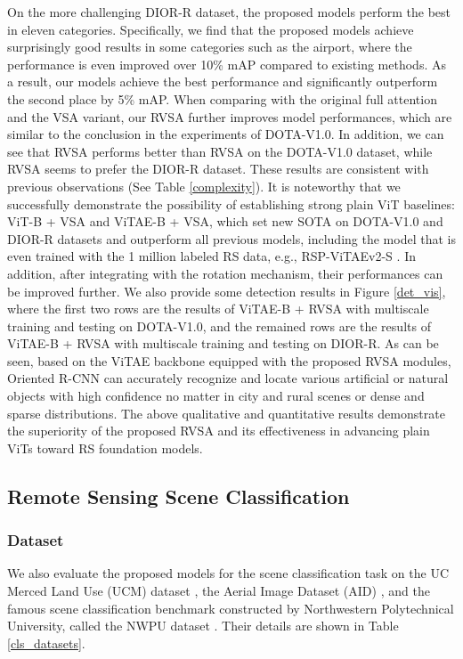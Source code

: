 \documentclass[10pt, journal,twoside]{IEEEtran}
\begin{document}
On the more challenging DIOR-R dataset, the proposed models perform the best in eleven categories. Specifically, we find that the proposed models achieve surprisingly good results in some categories such as the airport, where the performance is even improved over 10\% mAP compared to existing methods. As a result, our models achieve the best performance and significantly outperform the second place by 5\% mAP. When comparing with the original full attention and the VSA variant, our RVSA further improves model performances, which are similar to the conclusion in the experiments of DOTA-V1.0. In addition, we can see that RVSA performs better than RVSA on the DOTA-V1.0 dataset, while RVSA seems to prefer the DIOR-R dataset. These results are consistent with previous observations (See Table \ref{complexity}). It is noteworthy that we successfully demonstrate the possibility of establishing strong plain ViT baselines: ViT-B + VSA and ViTAE-B + VSA, which set new SOTA on DOTA-V1.0 \cite{dota1} and DIOR-R \cite{aod_2022_tgrs_dior_r_aopg} datasets and outperform all previous models, including the model that is even trained with the 1 million labeled RS data, e.g., RSP-ViTAEv2-S \cite{wang_rsp_2022}. In addition, after integrating with the rotation mechanism, their performances can be improved further. We also provide some detection results in Figure \ref{det_vis}, where the first two rows are the results of ViTAE-B + RVSA with multiscale training and testing on DOTA-V1.0, and the remained rows are the results of ViTAE-B + RVSA with multiscale training and testing on DIOR-R. As can be seen, based on the ViTAE backbone equipped with the proposed RVSA modules, Oriented R-CNN can accurately recognize and locate various artificial or natural objects with high confidence no matter in city and rural scenes or dense and sparse distributions. The above qualitative and quantitative results demonstrate the superiority of the proposed RVSA and its effectiveness in advancing plain ViTs toward RS foundation models. 
 

\subsection{Remote Sensing Scene Classification}
\subsubsection{Dataset}
We also evaluate the proposed models for the scene classification task on the UC Merced Land Use (UCM) dataset \cite{ucm}, the Aerial Image Dataset (AID) \cite{aid}, and the famous scene classification benchmark constructed by Northwestern Polytechnical University, called the NWPU dataset \cite{asr_review}. Their details are shown in Table \ref{cls_datasets}.
\end{document}
